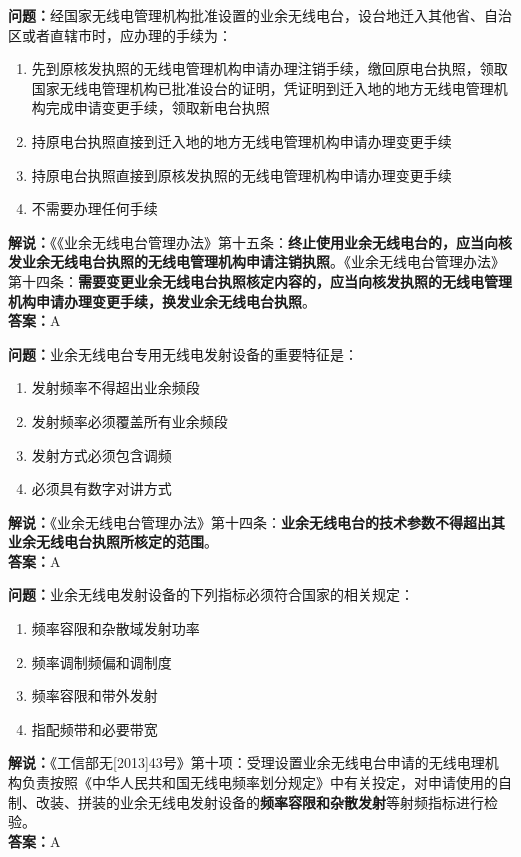 \textbf{问题：}经国家无线电管理机构批准设置的业余无线电台，设台地迁入其他省、自治区或者直辖市时，应办理的手续为：
\begin{enumerate}[label=\Alph*), leftmargin=1cm]
	\item 先到原核发执照的无线电管理机构申请办理注销手续，缴回原电台执照，领取国家无线电管理机构已批准设台的证明，凭证明到迁入地的地方无线电管理机构完成申请变更手续，领取新电台执照
	\item 持原电台执照直接到迁入地的地方无线电管理机构申请办理变更手续
	\item 持原电台执照直接到原核发执照的无线电管理机构申请办理变更手续
	\item 不需要办理任何手续
\end{enumerate}
\textbf{解说：}《《业余无线电台管理办法》第十五条：\textbf{终止使用业余无线电台的，应当向核发业余无线电台执照的无线电管理机构申请注销执照}。《业余无线电台管理办法》第十四条：\textbf{需要变更业余无线电台执照核定内容的，应当向核发执照的无线电管理机构申请办理变更手续，换发业余无线电台执照}。\\\textbf{答案：}A%

\textbf{问题：}业余无线电台专用无线电发射设备的重要特征是：
\begin{enumerate}[label=\Alph*), leftmargin=1cm]
	\item 发射频率不得超出业余频段
	\item 发射频率必须覆盖所有业余频段
	\item 发射方式必须包含调频
	\item 必须具有数字对讲方式
\end{enumerate}
\textbf{解说：}《业余无线电台管理办法》第十四条：\textbf{业余无线电台的技术参数不得超出其业余无线电台执照所核定的范围}。\\\textbf{答案：}A%

\textbf{问题：}业余无线电发射设备的下列指标必须符合国家的相关规定：
\begin{enumerate}[label=\Alph*), leftmargin=1cm]
	\item 频率容限和杂散域发射功率
	\item 频率调制频偏和调制度
	\item 频率容限和带外发射
	\item 指配频带和必要带宽
\end{enumerate}
\textbf{解说：}《工信部无[2013]43号》第十项：受理设置业余无线电台申请的无线电理机构负责按照《中华人民共和国无线电频率划分规定》中有关投定，对申请使用的自制、改装、拼装的业余无线电发射设备的\textbf{频率容限和杂散发射}等射频指标进行检验。\\\textbf{答案：}A


